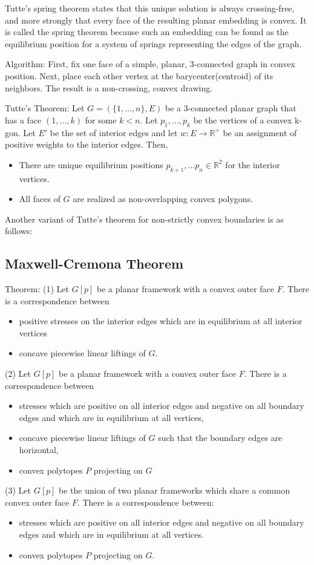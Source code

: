 \documentclass{article}
\newcommand{\R}{\mathbb{R}}
\begin{document}
  Tutte's spring theorem states that this unique solution is always crossing-free, and more strongly that every face of the resulting planar embedding is convex. It is called the spring theorem because such an embedding can be found as the equilibrium position for a system of springs representing the edges of the graph.
  
  Algorithm: First, fix one face of a simple, planar, 3-connected graph in convex position. Next, place each other vertex at the barycenter(centroid) of its neighbors. The result is a non-crossing, convex drawing.
 
 Tutte's Theorem: Let $G = (\{1,...,n\},E)$ be a 3-connected planar graph that has a face $(1,...,k)$ for some $k<n$. Let $p_1,...,p_k$ be the vertices of a convex k-gon. Let $E'$ be the set of interior edges and let $w : E \rightarrow \R^+$ be an assignment of positive weights to the interior edges. Then,
 	\begin{itemize}
		\item There are unique equilibrium positions $p_{k+1}, ...p_n \in \R^2$ for the interior vertices. 
		\item All faces of $G$ are realized as non-overlapping convex polygons.
	\end{itemize}
Another variant of Tutte's theorem for non-strictly convex boundaries is as follows:


 \subsection{Maxwell-Cremona Theorem}
 Theorem: (1) Let $G[p]$ be a planar framework with a convex outer face $F$. There is a correspondence between
 \begin{itemize}
 	\item positive stresses on the interior edges which are in equilibrium at all interior vertices
	\item concave piecewise linear liftings of $G$.
 \end{itemize}
 (2) Let $G[p]$ be a planar framework with a convex outer face $F$. There is a correspondence between
 \begin{itemize}
 	\item stresses which are positive on all interior edges and negative on all boundary edges and which are in equilibrium at all vertices,
	\item concave piecewise linear liftings of $G$ such that the boundary edges are horizontal,
	\item convex polytopes $P$ projecting on $G$
 \end{itemize}
 (3) Let $G[p]$ be the union of two planar frameworks which share a common convex outer face $F$. There is a correspondence between:
 \begin{itemize}
 	\item stresses which are positive on all interior edges and negative on all boundary edges and which are in equilibrium at all vertices.
	\item convex polytopes $P$ projecting on $G$.
 \end{itemize}
 
\end{document}
